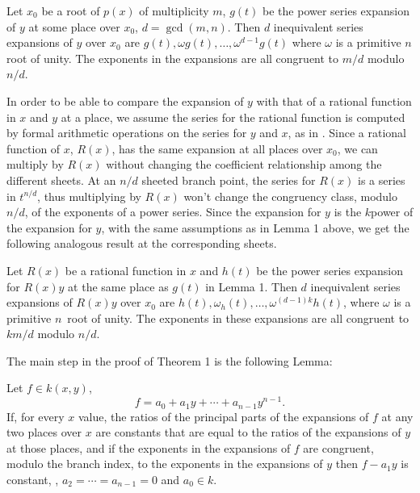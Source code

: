 \begin{lemma}
Let $x_0$ be a root of $p(x)$ of multiplicity $m$, $g(t)$ be the power
series expansion of $y$ at some place over $x_0$, $d=\gcd(m,n)$.  Then
$d$ inequivalent series expansions of $y$ over $x_0$ are $g(t), \omega
g(t), \ldots, \omega^{d-1}g(t)$ where $\omega$ is a primitive $n$\th
root of unity.  The exponents in the expansions are all congruent to
$m/d$ modulo $n/d$.
\end{lemma}

In order to be able to compare the expansion of $y$ with that of a
rational function in $x$ and $y$ at a place, we assume the series for
the rational function is computed by formal arithmetic operations on
the series for $y$ and $x$, as in \cite{Zippel76}.  Since a
rational function of $x$, $R(x)$, has the same expansion at all places
over $x_0$, we can multiply by $R(x)$ without changing the coefficient
relationship among the different sheets.  At an $n/d$ sheeted branch
point, the series for $R(x)$ is a series in $t^{n/d}$, thus
multiplying by $R(x)$ won't change the congruency class, modulo $n/d$,
of the exponents of a power series.  Since the expansion for $y$ is
the $k$\th power of the expansion for $y$, with the same assumptions
as in Lemma 1 above, we get the following analogous result at the
corresponding sheets.

\begin{lemma}
Let $R(x)$ be a rational function in $x$ and $h(t)$ be
the power series expansion for $R(x)y$ at the same place as $g(t)$ in
Lemma 1.  Then $d$ inequivalent series expansions of $R(x)y$ over $x_0$ are
$h(t), \omega_ h(t), \ldots, \omega^{(d-1)k}h(t)$, where
$\omega$ is a primitive $n$\th\ root of unity.  The exponents in
these expansions are all congruent to $km/d$ modulo $n/d$.
\end{lemma}
	
The main step in the proof of Theorem 1 is the following Lemma:

\begin{lemma}
Let $f \in k(x,y)$, 
\[
f = a_0 + a_1 y + \cdots + a_{n-1}y^{n-1}.
\]
If, for every $x$ value, the ratios of the principal parts of the
expansions of $f$ at any two places over $x$ are constants that are
equal to the ratios of the expansions of $y$ at those places, and if
the exponents in the expansions of $f$ are congruent, modulo the
branch index, to the exponents in the expansions of $y$ then $f-a_1 y$
is constant, \ie, $a_2= \cdots =a_{n-1}=0$ and $a_0 \in k$.
\end{lemma}

